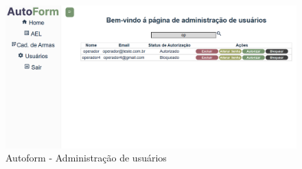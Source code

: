\begin{figure}[H]
    \caption{\label{fig:tela-configuracoes}Autoform - Administração de usuários}
    \begin{center}
        \includegraphics[scale=0.5]{imagens/autoform-configuracoes.png}
    \end{center}
\end{figure}










